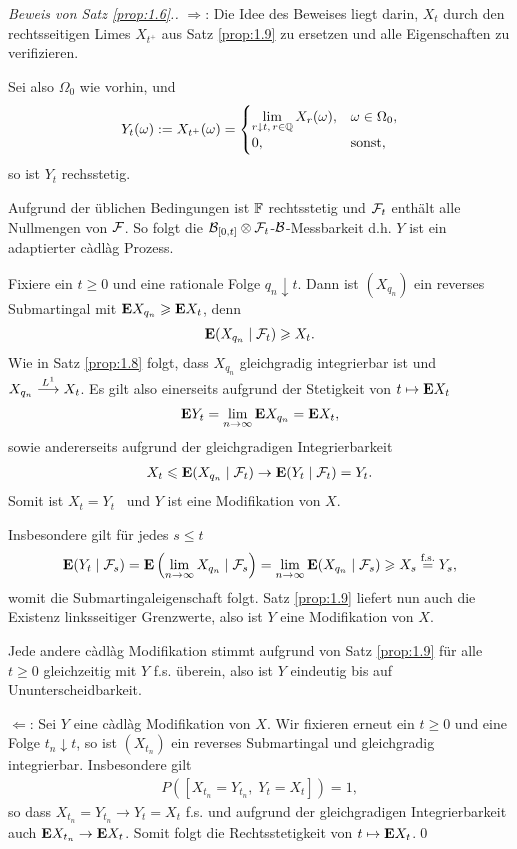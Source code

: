 \begin{proof}[Beweis von Satz \ref{prop:1.6}.]
$\Rightarrow$: Die Idee des Beweises liegt darin, $X_t$ durch den rechtsseitigen
Limes $X_{t^+}$ aus Satz \ref{prop:1.9} zu ersetzen und alle Eigenschaften zu
verifizieren.

Sei also $\Omega_0$ wie vorhin, und
\begin{align*}
Y_t(\omega) := X_{t^+}(\omega) =  \begin{cases}
\lim\limits_{r\downarrow t,\, r\in\mathbb{Q}} X_r(\omega), & \omega\in \Omega_0,\\
0, & \text{sonst},
\end{cases}
\end{align*}
so ist $Y_t$ rechsstetig. %

Aufgrund der üblichen Bedingungen ist $\mathbb{F}$ rechtsstetig und $\mathcal{F}_t$ enthält alle
Nullmengen von $\mathcal{F}$. So folgt die $\mathcal{B}_{[0,t]}\otimes\mathcal{F}_t$-$\mathcal{B}$-Messbarkeit
d.h. $Y$ ist ein adaptierter càdlàg Prozess.

Fixiere ein $t\ge 0$ und eine rationale Folge $q_n\downarrow t$. Dann ist
$(X_{q_n})$ ein reverses Submartingal mit $\mathbf{E} X_{q_n} \geqslant \mathbf{E} X_t$, denn
\begin{align*}
\mathbf{E}(X_{q_n}\mid \mathcal{F}_t) \geqslant X_t.
\end{align*} 
Wie in Satz \ref{prop:1.8} folgt, dass $X_{q_n}$ gleichgradig integrierbar ist
und $X_{q_n}\overset{L^1}{\longrightarrow} X_t$.
Es gilt also einerseits aufgrund der Stetigkeit von $t\mapsto \mathbf{E} X_t$
\begin{align*}
\mathbf{E} Y_t = \lim\limits_{n\to\infty} \mathbf{E} X_{q_n} = \mathbf{E} X_t,
\end{align*}
sowie andererseits aufgrund der gleichgradigen Integrierbarkeit
\begin{align*}
X_t \leqslant \mathbf{E}(X_{q_n}\mid\mathcal{F}_t) \to \mathbf{E}(Y_t\mid\mathcal{F}_t) = Y_t.
\end{align*}
Somit ist $X_t = Y_t$ \fs\ und $Y$ ist eine Modifikation von $X$. 

Insbesondere gilt für jedes $s\le t$
\begin{align*}
\mathbf{E}(Y_t\mid \mathcal{F}_s) = \mathbf{E}\left(\lim_{n\to \infty} X_{q_n}\mid\mathcal{F}_s\right)
= \lim_{n\to \infty} \mathbf{E}( X_{q_n}\mid\mathcal{F}_s) \geqslant X_s \overset{\text{f.s.}}{=} Y_s,
\end{align*}
womit die Submartingaleigenschaft folgt. Satz \ref{prop:1.9} liefert nun auch
die Existenz linksseitiger Grenzwerte, also ist $Y$ eine \cadlag Modifikation
von $X$.

Jede andere càdlàg Modifikation stimmt aufgrund von Satz \ref{prop:1.9} für alle
$t\ge 0$ gleichzeitig mit $Y$ f.s. überein, also ist $Y$ eindeutig bis auf
Ununterscheidbarkeit.


$\Leftarrow$: Sei $Y$ eine càdlàg Modifikation von $X$. Wir fixieren erneut ein
$t\ge 0$ und eine Folge $t_n\downarrow t$, so ist $(X_{t_n})$ ein reverses
Submartingal und gleichgradig integrierbar. Insbesondere gilt
\begin{align*}
P([X_{t_n} = Y_{t_n},\; Y_t = X_t]) = 1,
\end{align*}
so dass $X_{t_n}=Y_{t_n}\to Y_t = X_t$ f.s. und aufgrund der gleichgradigen
Integrierbarkeit auch $\mathbf{E} X_{t_n}\to \mathbf{E} X_t$. Somit folgt die
Rechtsstetigkeit von $t\mapsto \mathbf{E} X_t$.\qed
\end{proof}


